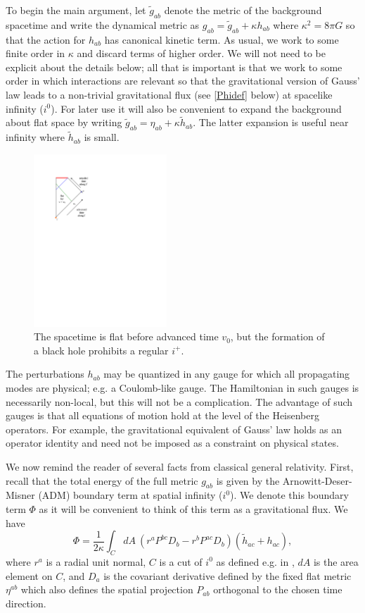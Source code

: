 \documentclass[12pt,onecolumn,eqsecnum,aps,prd,nofootinbib]{revtex4}
\def\be{\begin{equation}}
\def\ee{\end{equation}}
\begin{document}
To begin the main argument, let  $\tilde g_{ab}$ denote the metric of the background spacetime and write the
dynamical metric as $g_{ab} = \tilde g_{ab} + \kappa h_{ab}$ where
$\kappa^2 = 8 \pi G$ so that the action for $h_{ab}$ has canonical
kinetic term.
As usual, we work to some finite order in $\kappa$ and
discard terms of higher order.  We will not need to be explicit
about the details below; all that is important is that we work to
some order in which interactions are relevant so that the
gravitational version of Gauss' law leads to a non-trivial
gravitational flux (see \eqref{Phidef} below) at spacelike infinity ($i^0$).
For later use it will also be convenient to expand the
background about flat space by writing $\tilde g_{ab} = \eta_{ab} +
\kappa \tilde h_{ab}$.  The latter expansion is useful near infinity
where $\tilde h_{ab}$ is small.

\begin{figure}
\includegraphics[width=5cm] {collapse.pdf}
 \caption{The spacetime is flat before advanced time $v_0$, but the formation of a black hole prohibits a
 regular $i^+$.}
 \label{collapse}
 \end{figure}


The perturbations $h_{ab}$ may be quantized in any gauge for which all
propagating modes are physical; e.g. a Coulomb-like gauge. The
Hamiltonian in such gauges is necessarily non-local, but this will
not be a complication.  The advantage of such gauges is that all
equations of motion hold at the level of the Heisenberg operators. For example, the gravitational equivalent of Gauss' law holds as an
operator identity and need not be imposed as a constraint on
physical states.

We now remind the reader of several facts from classical general
relativity.  First, recall that the total energy of the full metric
$g_{ab}$ is given by the Arnowitt-Deser-Misner (ADM) boundary term
at spatial infinity ($i^0$).  We denote this boundary term $\Phi$ as
it will be convenient to think of this term as a gravitational flux.
We have
 \be
 \label{Phidef}
 \Phi = \frac{1}{2\kappa} \int_C dA \  \left( r^a P^{bc} D_b
 - r^b P^{ac} D_b  \right) (\tilde h_{ac} + h_{ac}),
 \ee
where $r^a$ is a radial unit normal, $C$ is a cut of $i^0$ as
defined e.g. in \cite{i0}, $dA$ is the area element on $C$, and
$D_a$ is the covariant derivative defined by the fixed flat metric
$\eta^{ab}$ which also defines the spatial projection $P_{ab}$
orthogonal to the chosen time direction.
\end{document}
